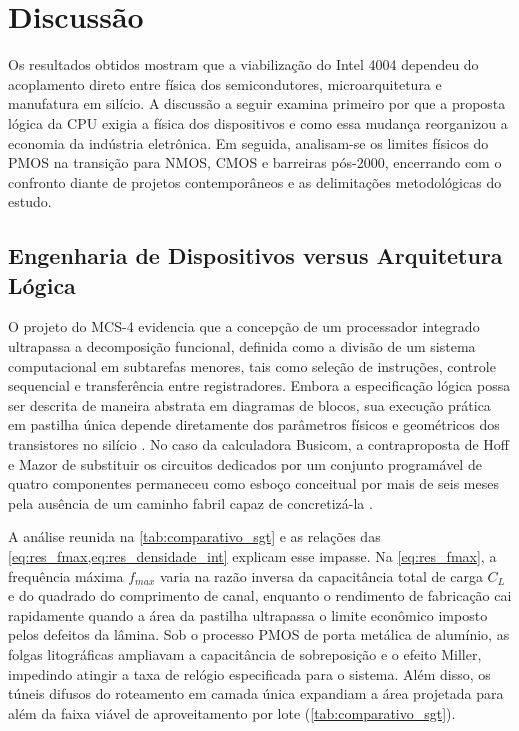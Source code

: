 
\section{Discussão}
\label{sec:discussao}

Os resultados obtidos mostram que a viabilização do Intel 4004 dependeu do acoplamento direto entre física dos semicondutores, microarquitetura e manufatura em silício. A discussão a seguir examina primeiro por que a proposta lógica da CPU exigia a física dos dispositivos e como essa mudança reorganizou a economia da indústria eletrônica. Em seguida, analisam-se os limites físicos do PMOS na transição para NMOS, CMOS e barreiras pós-2000, encerrando com o confronto diante de projetos contemporâneos e as delimitações metodológicas do estudo.

\subsection{Engenharia de Dispositivos versus Arquitetura Lógica}
\label{subsec:dispositivos_vs_arquitetura}

O projeto do MCS-4 evidencia que a concepção de um processador integrado ultrapassa a decomposição funcional, definida como a divisão de um sistema computacional em subtarefas menores, tais como seleção de instruções, controle sequencial e transferência entre registradores. Embora a especificação lógica possa ser descrita de maneira abstrata em diagramas de blocos, sua execução prática em pastilha única depende diretamente dos parâmetros físicos e geométricos dos transistores no silício \cite{cavin2012}. No caso da calculadora Busicom, a contraproposta de Hoff e Mazor de substituir os circuitos dedicados por um conjunto programável de quatro componentes permaneceu como esboço conceitual por mais de seis meses pela ausência de um caminho fabril capaz de concretizá-la \cite{faggin1996}.

A análise reunida na \cref{tab:comparativo_sgt} e as relações das \cref{eq:res_fmax,eq:res_densidade_int} explicam esse impasse. Na \cref{eq:res_fmax}, a frequência máxima $f_{max}$ varia na razão inversa da capacitância total de carga $C_L$ e do quadrado do comprimento de canal, enquanto o rendimento de fabricação cai rapidamente quando a área da pastilha ultrapassa o limite econômico imposto pelos defeitos da lâmina. Sob o processo PMOS de porta metálica de alumínio, as folgas litográficas ampliavam a capacitância de sobreposição e o efeito Miller, impedindo atingir a taxa de relógio especificada para o sistema. Além disso, os túneis difusos do roteamento em camada única expandiam a área projetada para além da faixa viável de aproveitamento por lote (\cref{tab:comparativo_sgt}).

